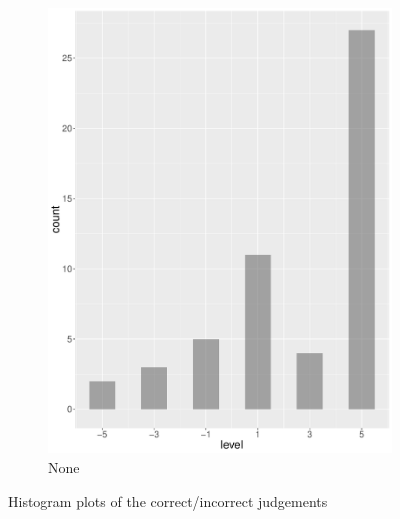 \begin{figure}
\begin{subfigure}[b]{0.4\textwidth}
        \includegraphics[width=\textwidth]{plots/tennis/hist_level_none}
        \caption{None}
        \label{fig:hist_level_tennis_none}
    \end{subfigure}
    \caption{Histogram plots of the correct/incorrect judgements}\label{fig:hist_level_tennis_all}
\end{figure}